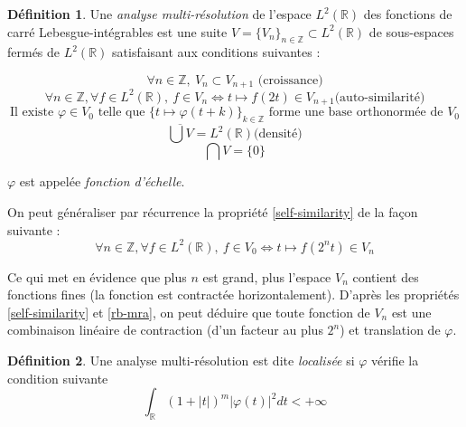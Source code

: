 \documentclass[]{article}
\theoremstyle{remark}
\theoremstyle{definition}
\newtheorem{mydef}{Définition}
\begin{document}
	\begin{mydef}
		Une \textit{analyse multi-résolution} de l'espace $L^2(\mathbb{R})$ des fonctions de carré Lebesgue-intégrables est une suite $V = \{V_n\}_{n \in \mathbb{Z}} \subset L^2(\mathbb{R})$ de sous-espaces fermés de $L^2(\mathbb{R})$ satisfaisant aux conditions suivantes :

		\begin{equation}
			\label{growth}
			\forall n \in \mathbb{Z}, ~ V_{n} \subset V_{n+1} \text{ (croissance)}
		\end{equation}
		\begin{equation}
			\label{self-similarity}
			\forall n \in \mathbb{Z}, \forall f \in L^2(\mathbb{R}), ~ f \in V_n \Longleftrightarrow t \mapsto f \left(2 t\right) \in V_{n+1} \text{(auto-similarité)}
		\end{equation}
		\begin{equation}
			\label{rb-mra}
			\text{Il existe $\varphi \in V_0$ telle que $\{t \mapsto \varphi(t + k)\}_{k \in \mathbb{Z}}$ forme une base orthonormée de $V_0$}
		\end{equation}
		\begin{equation}
			\label{density}
			\overline{\bigcup V} = L^2(\mathbb{R}) \text{(densité)}
		\end{equation}
		\begin{equation}
			\label{inter}
			\bigcap V = \{0\}
		\end{equation}
		
		$\varphi$ est appelée \textit{fonction d'échelle}.
	\end{mydef}
	
	On peut généraliser par récurrence la propriété \ref{self-similarity} de la façon suivante :
	\begin{equation}
		\forall n \in \mathbb{Z}, \forall f \in L^2(\mathbb{R}), ~ f \in V_0 \Longleftrightarrow t \mapsto f \left(2^n t\right) \in V_{n}
	\end{equation}

	Ce qui met en évidence que plus $n$ est grand, plus l'espace $V_n$ contient des fonctions fines (la fonction est contractée horizontalement). D'après les propriétés \ref{self-similarity} et \ref{rb-mra}, on peut déduire que toute fonction de $V_n$ est une combinaison linéaire de contraction (d'un facteur au plus $2^n$) et translation de $\varphi$.

	\begin{mydef}
		Une analyse multi-résolution est dite \textit{localisée} si $\varphi$ vérifie la condition suivante
		\begin{equation}
			\label{localized}
			\int_\mathbb{R} (1+|t|)^m |\varphi(t)|^2 dt < + \infty
		\end{equation}
	\end{mydef}
	
\end{document}
